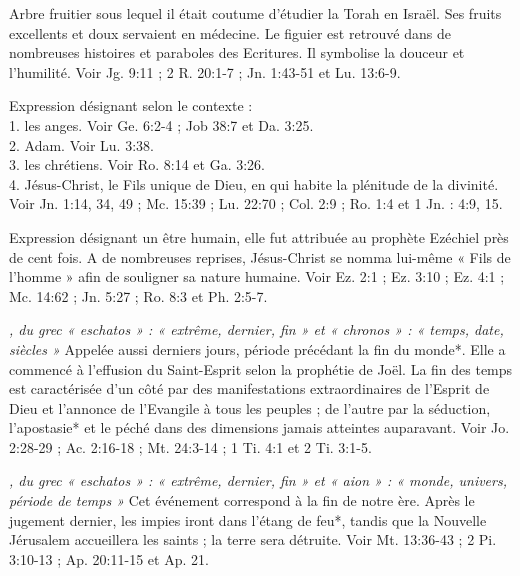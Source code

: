 \begin{multicols}{2}
{\textit{}\newline
Arbre fruitier sous lequel il était coutume d'étudier la Torah en Israël. Ses fruits excellents et doux servaient en médecine. Le figuier est retrouvé dans de nombreuses histoires et paraboles des Ecritures. Il symbolise la douceur et l'humilité. Voir Jg. 9:11 ; 2 R. 20:1-7 ; Jn. 1:43-51 et Lu. 13:6-9.

\textit{}\newline
Expression désignant selon le contexte :
\\1. les anges. Voir Ge. 6:2-4 ; Job 38:7 et Da. 3:25.
\\2. Adam. Voir Lu. 3:38.
\\3. les chrétiens. Voir Ro. 8:14 et Ga. 3:26.
\\4. Jésus-Christ, le Fils unique de Dieu, en qui habite la plénitude de la divinité. Voir Jn. 1:14, 34, 49 ; Mc. 15:39 ; Lu. 22:70 ; Col. 2:9 ; Ro. 1:4 et 1 Jn. : 4:9, 15.

\textit{}\newline
Expression désignant un être humain, elle fut attribuée au prophète Ezéchiel près de cent fois. A de nombreuses reprises, Jésus-Christ se nomma lui-même « Fils de l'homme » afin de souligner sa nature humaine. Voir Ez. 2:1 ; Ez. 3:10 ; Ez. 4:1 ; Mc. 14:62 ; Jn. 5:27 ; Ro. 8:3 et Ph. 2:5-7.

\textit{, du grec « eschatos » : « extrême, dernier, fin » et « chronos » : « temps, date, siècles »}\newline
Appelée aussi derniers jours, période précédant la fin du monde*. Elle a commencé à l'effusion du Saint-Esprit selon la prophétie de Joël. La fin des temps est caractérisée d'un côté par des manifestations extraordinaires de l'Esprit de Dieu et l'annonce de l'Evangile à tous les peuples ; de l'autre par la séduction, l'apostasie* et le péché dans des dimensions jamais atteintes auparavant. Voir Jo. 2:28-29 ; Ac. 2:16-18 ; Mt. 24:3-14 ; 1 Ti. 4:1 et 2 Ti. 3:1-5.

\textit{, du grec « eschatos » : « extrême, dernier, fin » et « aion » : « monde, univers, période de temps »}\newline
Cet événement correspond à la fin de notre ère. Après le jugement dernier, les impies iront dans l'étang de feu*, tandis que la Nouvelle Jérusalem accueillera les saints ; la terre sera détruite. Voir Mt. 13:36-43 ; 2 Pi. 3:10-13 ; Ap. 20:11-15 et Ap. 21.

}
\end{multicols}
